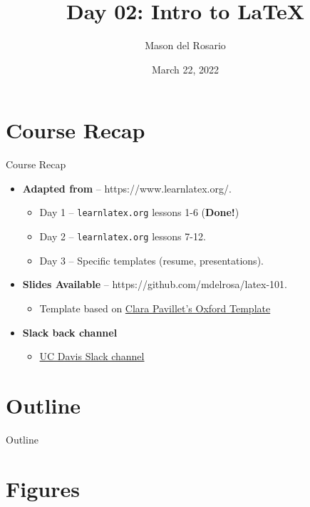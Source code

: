\documentclass{beamer}
\title{Day 02: Intro to \LaTeX}
\author{\small{Mason del Rosario}}
\institute{\LaTeX 101}
\date{March 22, 2022} %
\begin{document}
\footnotesize{
% 


{ 
\frame{\titlepage}}

  \section*{Course Recap}

  \begin{frame}{Course Recap}
    \begin{itemize} 
      \item \textbf{Adapted from} -- https://www.learnlatex.org/. 
        \begin{itemize}
          \item Day 1 -- \texttt{learnlatex.org} lessons 1-6 (\textbf{Done!})
          \item Day 2 -- \texttt{learnlatex.org} lessons 7-12.
          \item Day 3 -- Specific templates (resume, presentations).
        \end{itemize}
      \item \textbf{Slides Available} -- https://github.com/mdelrosa/latex-101.
      \begin{itemize}
        \item Template based on \href{https://www.overleaf.com/latex/templates/oxpav/xnjgrxthvjhg}{Clara Pavillet's Oxford Template}
      \end{itemize}
      \item \textbf{Slack back channel}
      \begin{itemize}
        \item \href{https://join.slack.com/share/zt-ul82okyc-SI2GftuwPx_lFyBXll9rjw}{UC Davis Slack channel}
      \end{itemize}
    \end{itemize}
  \end{frame}

  \section*{Outline}\begin{frame}{Outline}\tableofcontents\end{frame}

  \section{Figures}

}
\end{document}
